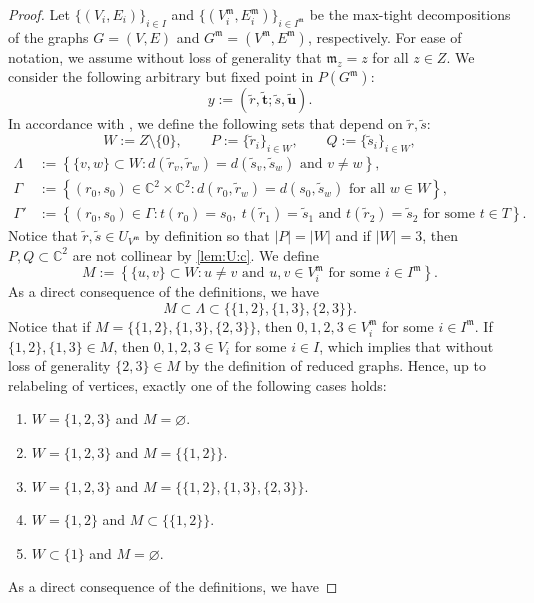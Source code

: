 \documentclass[12pt]{article}
\theoremstyle{definition}
\newcommand{\RL}[2]{\Cref{lem:#1}\ref{lem:#1:#2}}
\newcommand{\Wlog}{without loss of generality }
\newcommand{\resp}{respectively}
\newcommand{\set}[2]{\left\{#1:#2\right\}}
\newcommand{\C}{{\mathbb{C}}}
\newcommand{\cC}{\mathcal{C}}
\newcommand{\bt}{\mathbf{t}}
\newcommand{\bu}{\mathbf{u}}
\newcommand{\tr}{\tilde{r}}
\newcommand{\ts}{\tilde{s}}
\newcommand{\tbt}{\tilde{\bt}}
\newcommand{\tbu}{\tilde{\bu}}
\newcommand{\m}{\mathfrak{m}}
\newcommand{\sd}{d} %
\newcommand{\CM}{\cC_{_{G,\m}}}
\begin{document}
\begin{proof}
Let $\{(V_i,E_i)\}_{i\in I}$
and
$\{(V^\m_i,E^\m_i)\}_{i\in I^\m}$
be the max-tight decompositions of the graphs $G=(V,E)$ and $G^\m=(V^\m,E^\m)$, \resp.
For ease of notation, we assume \Wlog that
$\m_z=z$ for all $z\in Z$.
We consider the following arbitrary but fixed point in $P(G^\m)$:
\[
y:=(\tr,\tbt;\ts,\tbu).
\]
In accordance with , we define the following sets
that depend on $\tr,\ts$:
\[
W:=Z\setminus\{0\},\qquad
P:=\{\tr_i\}_{i\in W},\qquad
Q:=\{\ts_i\}_{i\in W},
\]
\begin{align*}
\Lambda &:=\set{\{v,w\}\subset W}{\sd(\tr_v,\tr_w)=\sd(\ts_v,\ts_w) \text{ and }v\neq w},\\
\Gamma  &:=\set{(r_0,s_0)\in\C^2\times\C^2}{\sd(r_0,\tr_w)=\sd(s_0,\ts_w) \text{ for all } w\in W},\\
\Gamma' &:=\set{(r_0,s_0)\in \Gamma}{t(r_0)=s_0,~ t(\tr_1)=\ts_1 \text{ and } t(\tr_2)=\ts_2 \text{ for some }t\in T}.
\end{align*}
Notice that $\tr,\ts\in U_{V^\m}$ by definition so that
$|P|=|W|$ and if $|W|=3$, then $P,Q\subset\C^2$ are not collinear by \RL{U}{c}.
We define
\[
M:=\set{\{u,v\}\subset W}{u\neq v \text{ and }  u,v\in V^\m_i \text{ for some }i\in I^\m }.
\]
As a direct consequence of the definitions, we have
\[
M\subset \Lambda\subset\{\{1,2\},\{1,3\},\{2,3\}\}.
\]
Notice that if $M=\{\{1,2\},\{1,3\},\{2,3\}\}$, then $0,1,2,3\in V^\m_i$ for some $i\in I^\m$.
If $\{1,2\},\{1,3\}\in M$, then $0,1,2,3\in V_i$ for some $i\in I$,
which implies that \Wlog $\{2,3\}\in M$ by the definition of reduced graphs.
Hence, up to relabeling of vertices, exactly one of the following cases holds:
\begin{enumerate}[topsep=0pt,itemsep=0pt,leftmargin=20mm,label=\textbf{Case~\arabic*.},ref={Case~\arabic*}]
\item\label{case1} $W=\{1,2,3\}$ and $M=\varnothing$.
\item\label{case2} $W=\{1,2,3\}$ and $M=\{\{1,2\}\}$.
\item\label{case3} $W=\{1,2,3\}$ and $M=\{\{1,2\},\{1,3\},\{2,3\}\}$.
\item\label{case4} $W=\{1,2\}$ and $M\subset\{\{1,2\}\}$.
\item\label{case5} $W\subset \{1\}$ and $M=\varnothing$.
\end{enumerate}
As a direct consequence of the definitions, we have

\end{proof}
\end{document}
